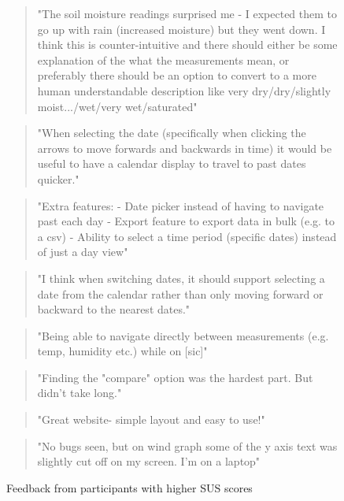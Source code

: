 \begin{figure}[H]
  \centering
  \begin{minipage}{0.9\textwidth}
    \begin{quote}
    "The soil moisture readings surprised me - I expected them to go up with
    rain (increased moisture) but they went down.  I think this is
    counter-intuitive and there should either be some explanation of the what
    the measurements mean, or preferably there should be an option to convert to
    a more human understandable description like very dry/dry/slightly
    moist.../wet/very wet/saturated"
    \end{quote}
 \vspace{8pt}
    \begin{quote}
    "When selecting the date (specifically when clicking the arrows to move
    forwards and backwards in time) it would be useful to have a calendar
    display to travel to past dates quicker."
    \end{quote}
 \vspace{8pt}
    \begin{quote}
    "Extra features: - Date picker instead of having to navigate past each day -
    Export feature to export data in bulk (e.g. to a csv) - Ability to select a
    time period (specific dates) instead of just a day view"
    \end{quote}
 \vspace{8pt}
    \begin{quote}
    "I think when switching dates, it should support selecting a date from the
    calendar rather than only moving forward or backward to the nearest dates."
    \end{quote}
 \vspace{8pt}
    \begin{quote}
    "Being able to navigate directly between measurements (e.g. temp, humidity
    etc.) while on [sic]"
    \end{quote}
 \vspace{8pt}
    \begin{quote}
    "Finding the "compare" option was the hardest part. But didn't take long." 
    \end{quote}
 \vspace{8pt}
    \begin{quote}
    "Great website- simple layout and easy to use!"
    \end{quote}
 \vspace{8pt}
    \begin{quote}
    "No bugs seen, but on wind graph some of the y axis text was slightly cut
    off on my screen. I'm on a laptop"
    \end{quote}
  \end{minipage}
  \caption{Feedback from participants with higher SUS scores}
  \label{fig:high-sus-feedback}
\end{figure}

